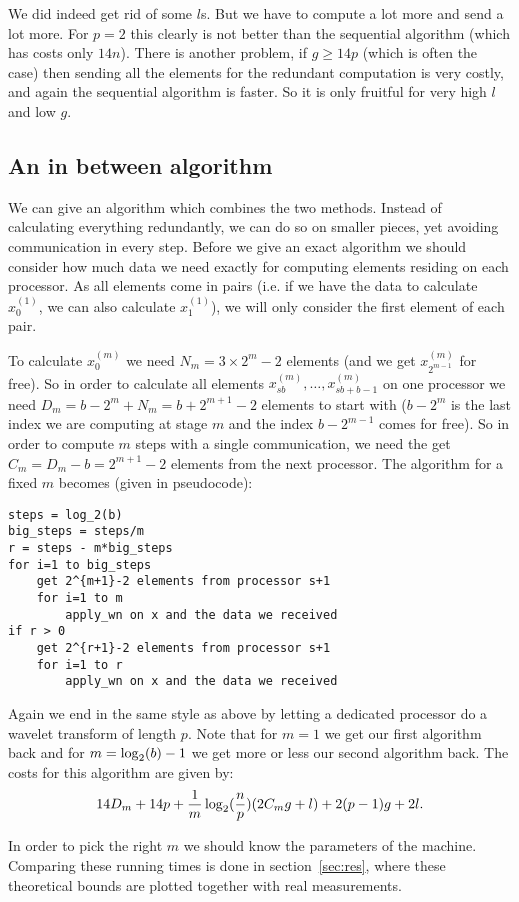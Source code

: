 We did indeed get rid of some $l$s. But we have to compute a lot more and send a lot more. For $p=2$ this clearly is not better than the sequential algorithm (which has costs only $14n$). There is another problem, if $g \geq 14p$ (which is often the case) then sending all the elements for the redundant computation is very costly, and again the sequential algorithm is faster. So it is only fruitful for very high $l$ and low $g$.


\subsection{An in between algorithm}
We can give an algorithm which combines the two methods. Instead of calculating everything redundantly, we can do so on smaller pieces, yet avoiding communication in every step. Before we give an exact algorithm we should consider how much data we need exactly for computing elements residing on each processor. As all elements come in pairs (i.e. if we have the data to calculate $x^{(1)}_0$, we can also calculate $x^{(1)}_1$), we will only consider the first element of each pair.

To calculate $x^{(m)}_0$ we need $N_m = 3 \times 2^m-2$ elements (and we get $x^{(m)}_{2^{m-1}}$ for free). So in order to calculate all elements $x^{(m)}_{sb}, \ldots, x^{(m)}_{sb+b-1}$ on one processor we need $D_m = b - 2^m + N_m = b + 2^{m+1} - 2$ elements to start with ($b-2^m$ is the last index we are computing at stage $m$ and the index $b - 2^{m-1}$ comes for free). So in order to compute $m$ steps with a single communication, we need the get $C_m = D_m - b = 2^{m+1} - 2$ elements from the next processor. The algorithm for a fixed $m$ becomes (given in pseudocode):

\begin{lstlisting}
steps = log_2(b)
big_steps = steps/m
r = steps - m*big_steps
for i=1 to big_steps
	get 2^{m+1}-2 elements from processor s+1
	for i=1 to m
		apply_wn on x and the data we received
if r > 0
	get 2^{r+1}-2 elements from processor s+1
	for i=1 to r
		apply_wn on x and the data we received
\end{lstlisting}

Again we end in the same style as above by letting a dedicated processor do a wavelet transform of length $p$. Note that for $m=1$ we get our first algorithm back and for $m = \operatorname{\log_2}(b)-1$ we get more or less our second algorithm back. The costs for this algorithm are given by:
\[ 14D_m + 14p + \frac{1}{m}\operatorname{\log_2}(\frac{n}{p})(2C_mg+l) + 2(p-1)g + 2l. \]

In order to pick the right $m$ we should know the parameters of the machine. Comparing these running times is done in section~\ref{sec:res}, where these theoretical bounds are plotted together with real measurements.
